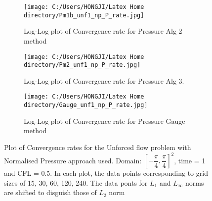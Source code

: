 \begin{figure}[H]
	\centering
	\begin{subfigure}[t]{4.5in}
		\centering
		\texttt{[image: C:/Users/HONGJI/Latex Home directory/Pm1b\_unf1\_np\_P\_rate.jpg]}
		\caption{Log-Log plot of Convergence rate for Pressure Alg 2 method}\label{fig:6.14a}		
	\end{subfigure}
	\quad
	\begin{subfigure}[t]{4.5in}
		\centering
		\texttt{[image: C:/Users/HONGJI/Latex Home directory/Pm2\_unf1\_np\_P\_rate.jpg]}
		\caption{Log-Log plot of Convergence rate for Pressure Alg 3. }\label{fig:6.14b}
	\end{subfigure}
	\quad
	\begin{subfigure}[t]{4.5in}
		\centering
		\texttt{[image: C:/Users/HONGJI/Latex Home directory/Gauge\_unf1\_np\_P\_rate.jpg]}
		\caption{Log-Log plot of Convergence rate for Pressure Gauge method }\label{fig:6.14c}
	\end{subfigure}
	\caption{Plot of Convergence rates for the Unforced flow problem with Normalised Pressure approach used. Domain: $[-\dfrac{\pi}{4}, \dfrac{\pi}{4}]^2$, time = 1 and CFL = 0.5. In each plot, the data points corresponding to grid sizes of 15, 30, 60, 120, 240. The data ponts for $L_1$ and $L_\infty$ norms are shifted to disguish those of $L_2$ norm}\label{fig:6.14}
\end{figure}

